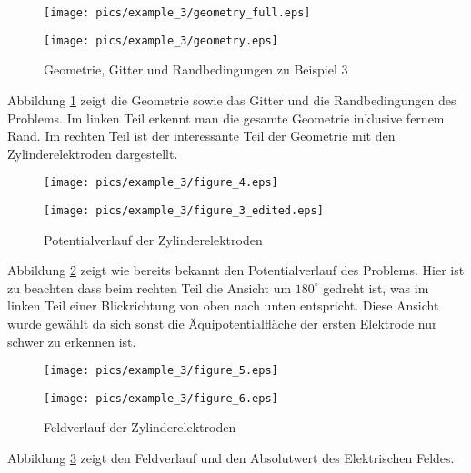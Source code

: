 \begin{figure}[H]
	\begin{minipage}{0.5\textwidth}
		\texttt{[image: pics/example\_3/geometry\_full.eps]}
	\end{minipage}
	\begin{minipage}{0.5\textwidth}
		\texttt{[image: pics/example\_3/geometry.eps]}
	\end{minipage}
	\caption{Geometrie, Gitter und Randbedingungen zu Beispiel 3}
	\label{fig:example_3_geometry}
\end{figure}

Abbildung \ref{fig:example_3_geometry} zeigt die Geometrie sowie das Gitter und die Randbedingungen des Problems. Im linken Teil erkennt man die gesamte Geometrie inklusive fernem Rand. Im rechten Teil ist der interessante Teil der Geometrie mit den Zylinderelektroden dargestellt. 

\begin{figure}[htbp]
	\begin{minipage}{0.5\textwidth}
		\texttt{[image: pics/example\_3/figure\_4.eps]}
	\end{minipage}
	\begin{minipage}{0.5\textwidth}
		\texttt{[image: pics/example\_3/figure\_3\_edited.eps]}
	\end{minipage}
	\caption{Potentialverlauf der Zylinderelektroden}
	\label{fig:cylinder_electrodes_potential}
\end{figure}

Abbildung \ref{fig:cylinder_electrodes_potential} zeigt wie bereits bekannt den Potentialverlauf des Problems. Hier ist zu beachten dass beim rechten Teil die Ansicht um $180^{\circ}$ gedreht ist, was im linken Teil einer Blickrichtung von oben nach unten entspricht. Diese Ansicht wurde gewählt da sich sonst die Äquipotentialfläche der ersten Elektrode nur schwer zu erkennen ist.


\begin{figure}[htbp]
	\begin{minipage}{0.5\textwidth}
		\texttt{[image: pics/example\_3/figure\_5.eps]}
	\end{minipage}
	\begin{minipage}{0.5\textwidth}
		\texttt{[image: pics/example\_3/figure\_6.eps]}
	\end{minipage}
	\caption{Feldverlauf der Zylinderelektroden}
	\label{fig:cylinder_electrodes_field}
\end{figure}


Abbildung \ref{fig:cylinder_electrodes_field} zeigt den Feldverlauf und den Absolutwert des Elektrischen Feldes.